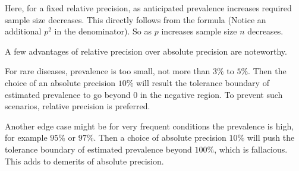 \documentclass[11pt, a4paper]{article}
\begin{document}
Here, for a fixed relative precision, as anticipated prevalence increases required sample size decreases. This directly follows from the formula (Notice an additional $p^2$ in the denominator). So as $p$ increases sample size $n$ decreases.

\smallpencil \hspace{0.1cm} A few advantages of relative precision over absolute precision are noteworthy.

For rare diseases, prevalence is too small, not more than $3\%$ to $5\%$. Then the choice of an absolute precision $10\%$ will result the tolerance boundary of estimated prevalence to go beyond 0 in the negative region. To prevent such scenarios, relative precision is preferred.

Another edge case might be for very frequent conditions the prevalence is high, for example $95\%$ or $97\%$. Then a choice of absolute precision $10\%$ will push the tolerance boundary of estimated prevalence beyond $100\%$, which is fallacious. This adds to demerits of absolute precision.
\end{document}
